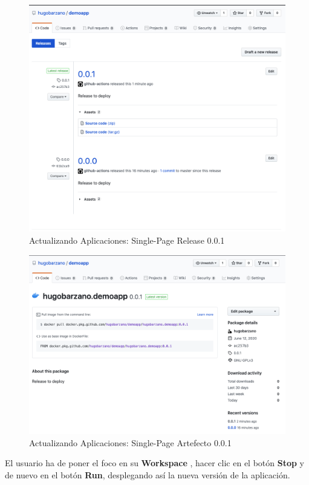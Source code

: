 \documentclass[a4paper,11pt]{book}
\begin{document}
   \begin{figure}[H]
\centering
\includegraphics[scale=0.27]{imagenes/casouso_a/2_8.png}
\caption{  Actualizando Aplicaciones: Single-Page Release 0.0.1}
\label{2_8}
\end{figure}

\begin{figure}[H]
\centering
\includegraphics[scale=0.27]{imagenes/casouso_a/2_9.png}
\caption{  Actualizando Aplicaciones: Single-Page Artefecto 0.0.1 }
\label{2_9}
\end{figure}
 
 \newpage
 El usuario ha de poner el foco en su \textbf{Workspace} , hacer clic en el botón \textbf{Stop} y de nuevo en el botón \textbf{Run}, desplegando así la nueva versión de la aplicación. 
 
\end{document}

